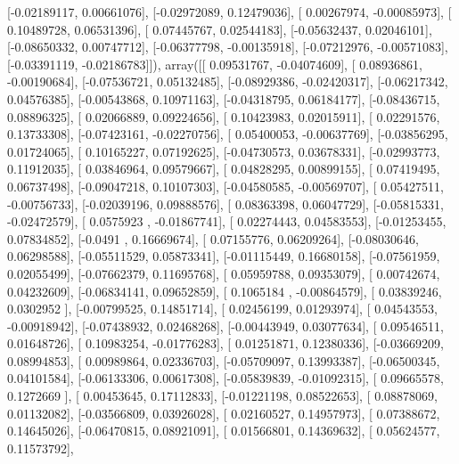 \documentclass{article}
\begin{document}
       [-0.02189117,  0.00661076],
       [-0.02972089,  0.12479036],
       [ 0.00267974, -0.00085973],
       [ 0.10489728,  0.06531396],
       [ 0.07445767,  0.02544183],
       [-0.05632437,  0.02046101],
       [-0.08650332,  0.00747712],
       [-0.06377798, -0.00135918],
       [-0.07212976, -0.00571083],
       [-0.03391119, -0.02186783]]), array([[ 0.09531767, -0.04074609],
       [ 0.08936861, -0.00190684],
       [-0.07536721,  0.05132485],
       [-0.08929386, -0.02420317],
       [-0.06217342,  0.04576385],
       [-0.00543868,  0.10971163],
       [-0.04318795,  0.06184177],
       [-0.08436715,  0.08896325],
       [ 0.02066889,  0.09224656],
       [ 0.10423983,  0.02015911],
       [ 0.02291576,  0.13733308],
       [-0.07423161, -0.02270756],
       [ 0.05400053, -0.00637769],
       [-0.03856295,  0.01724065],
       [ 0.10165227,  0.07192625],
       [-0.04730573,  0.03678331],
       [-0.02993773,  0.11912035],
       [ 0.03846964,  0.09579667],
       [ 0.04828295,  0.00899155],
       [ 0.07419495,  0.06737498],
       [-0.09047218,  0.10107303],
       [-0.04580585, -0.00569707],
       [ 0.05427511, -0.00756733],
       [-0.02039196,  0.09888576],
       [ 0.08363398,  0.06047729],
       [-0.05815331, -0.02472579],
       [ 0.0575923 , -0.01867741],
       [ 0.02274443,  0.04583553],
       [-0.01253455,  0.07834852],
       [-0.0491    ,  0.16669674],
       [ 0.07155776,  0.06209264],
       [-0.08030646,  0.06298588],
       [-0.05511529,  0.05873341],
       [-0.01115449,  0.16680158],
       [-0.07561959,  0.02055499],
       [-0.07662379,  0.11695768],
       [ 0.05959788,  0.09353079],
       [ 0.00742674,  0.04232609],
       [-0.06834141,  0.09652859],
       [ 0.1065184 , -0.00864579],
       [ 0.03839246,  0.0302952 ],
       [-0.00799525,  0.14851714],
       [ 0.02456199,  0.01293974],
       [ 0.04543553, -0.00918942],
       [-0.07438932,  0.02468268],
       [-0.00443949,  0.03077634],
       [ 0.09546511,  0.01648726],
       [ 0.10983254, -0.01776283],
       [ 0.01251871,  0.12380336],
       [-0.03669209,  0.08994853],
       [ 0.00989864,  0.02336703],
       [-0.05709097,  0.13993387],
       [-0.06500345,  0.04101584],
       [-0.06133306,  0.00617308],
       [-0.05839839, -0.01092315],
       [ 0.09665578,  0.1272669 ],
       [ 0.00453645,  0.17112833],
       [-0.01221198,  0.08522653],
       [ 0.08878069,  0.01132082],
       [-0.03566809,  0.03926028],
       [ 0.02160527,  0.14957973],
       [ 0.07388672,  0.14645026],
       [-0.06470815,  0.08921091],
       [ 0.01566801,  0.14369632],
       [ 0.05624577,  0.11573792],
\end{document}
